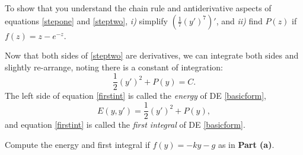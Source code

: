 \documentclass[12pt]{article}
\theoremstyle{definition}
\begin{document}
\begin{exerpart}
To show that you understand the chain rule and antiderivative aspects of equations \eqref{stepone} and \eqref{steptwo}, \emph{i)} simplify $\left(\frac{1}{7} (y')^7\right)'$, and \emph{ii)} find $P(z)$ if $f(z)=z-e^{-z}$.
\end{exerpart}

Now that both sides of \eqref{steptwo} are derivatives, we can integrate both sides and slightly re-arrange, noting there is a constant of integration:
\begin{equation}
  \frac{1}{2} (y')^2 + P(y) = C.  \label{firstint}
\end{equation}
The left side of equation \eqref{firstint} is called the \emph{energy} of DE \eqref{basicform},
\begin{equation}
  E(y,y') = \frac{1}{2} (y')^2 + P(y),  \label{energydefn}
\end{equation}
and equation \eqref{firstint} is called the \emph{first integral} of DE \eqref{basicform}.

\begin{exerpart}
Compute the energy and first integral if $f(y)=-ky-g$ as in \textbf{Part (a)}.
\end{exerpart}
\end{document}
